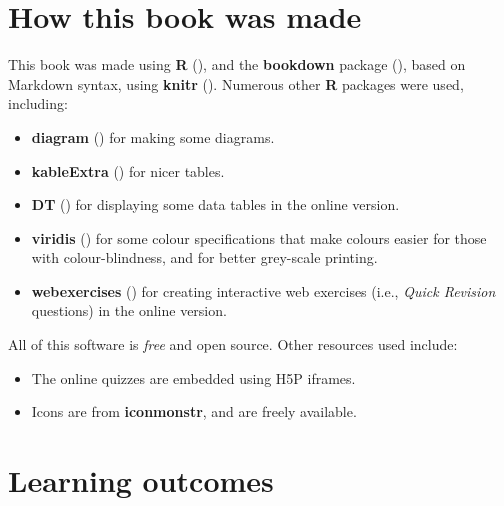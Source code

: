 \documentclass[
  11pt,
  a4paper,
  krantz2]{krantz}
\providecommand{\tightlist}{%
  \setlength{\itemsep}{0pt}\setlength{\parskip}{0pt}}
\begin{document}
\section*{How this book was made}\label{how-this-book-was-made}


This book was made using \textbf{R} (), and the \textbf{bookdown} package (), based on
Markdown syntax,
using \textbf{knitr} ().
Numerous other \textbf{R} packages were used, including:

\begin{itemize}
\tightlist
\item
  \textbf{diagram} () for making some diagrams.
\item
  \textbf{kableExtra} () for nicer tables.
\item
  \textbf{DT} () for displaying some data tables in the online version.
\item
  \textbf{viridis} () for some colour specifications that make colours easier for those with colour-blindness, and for better grey-scale printing.
\item
  \textbf{webexercises} () for creating interactive web exercises (i.e., \emph{Quick Revision} questions) in the online version.
\end{itemize}

All of this software is \emph{free} and open source.
Other resources used include:

\begin{itemize}
\tightlist
\item
  The online quizzes are embedded using
  H5P
  iframes.
\item
  Icons are from
  \textbf{iconmonstr},
  and are freely available.
\end{itemize}

\section*{Learning outcomes}\label{learning-outcomes}
\end{document}
